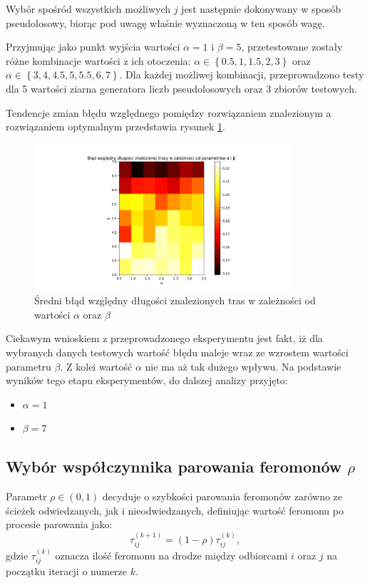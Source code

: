 \documentclass[10pt]{article}
\begin{document}
Wybór spośród wszystkich możliwych $j$ jest następnie dokonywany w sposób pseudolosowy, biorąc pod uwagę właśnie wyznaczoną w ten sposób wagę. 

Przyjmując jako punkt wyjścia wartości $\alpha = 1$ i $\beta = 5$, przetestowane zostały różne kombinacje wartości z ich otoczenia: $\alpha \in \left\{ 0.5, 1, 1.5, 2, 3 \right\}$ oraz $\alpha \in \left\{ 3, 4, 4.5, 5, 5.5, 6, 7 \right\}$. Dla każdej możliwej kombinacji, przeprowadzono testy dla 5 wartości ziarna generatora liczb pseudolosowych oraz 3 zbiorów testowych.

Tendencje zmian błędu względnego pomiędzy rozwiązaniem znalezionym a rozwiązaniem optymalnym przedstawia rysunek \ref{fig:alphabeta}.

\begin{figure}[H]
    \centering
    \includegraphics[width=0.85\textwidth]{alphabeta.png}
    \caption{Średni błąd względny długości znalezionych tras w zależności od wartości $\alpha$ oraz $\beta$}
    \label{fig:alphabeta}
\end{figure}

Ciekawym wnioskiem z przeprowadzonego eksperymentu jest fakt, iż dla wybranych danych testowych wartość błędu maleje wraz ze wzrostem wartości parametru $\beta$. Z kolei wartość $\alpha$ nie ma aż tak dużego wpływu. Na podstawie wyników tego etapu eksperymentów, do dalszej analizy przyjęto:
\begin{itemize}
    \item $\alpha = 1$
    \item $\beta = 7$  
\end{itemize}

\subsection{Wybór współczynnika parowania feromonów $\rho$}
Parametr $\rho \in \left(0, 1\right)$ decyduje o szybkości parowania feromonów zarówno ze ścieżek odwiedzanych, jak i nieodwiedzanych, definiując wartość feromonu po procesie parowania jako:
$$\tau_{ij}^{(k+1)} = (1-\rho)\tau_{ij}^{(k)} ,$$ gdzie $\tau_{ij}^{(k)}$ oznacza ilość feromonu na drodze między odbiorcami $i$ oraz $j$ na początku iteracji o numerze $k$.
\end{document}
